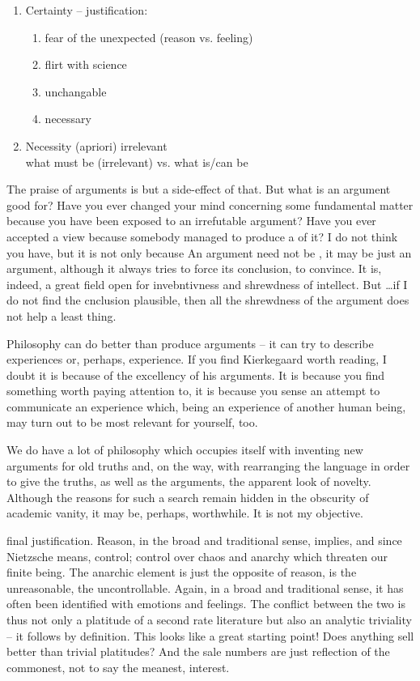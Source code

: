 {\begin{enumerate}
\item Certainty -- justification:
 \begin{enumerate}
  \item fear of the unexpected (reason vs. feeling)
  \item flirt with science
  \item[\isimp] unchangable
  \item[\isimp] necessary
 \end{enumerate}
\item Necessity (apriori) \impl irrelevant \\
what must be (irrelevant) vs. what is/can be
\end{enumerate}

\pa
The praise of arguments is but a side-effect of that. But what is an 
argument good for? Have you ever changed your mind concerning some 
fundamental matter because you have been exposed to an irrefutable 
argument? Have you ever accepted a view because somebody managed to 
produce a  of it? I do not think you have, but it is not 
only because
 An argument need not be , it may be just an argument, although it always tries to force 
its conclusion, to convince. It is, indeed, a great field open for 
invebntivness and shrewdness of intellect. But \ldots if I do not find 
the cnclusion plausible, then all the shrewdness of the argument does 
not help a least thing.

Philosophy can do better than produce arguments -- it can try to 
describe experiences or, perhaps, experience. If you find Kierkegaard 
worth reading, I doubt it is because of the excellency of his 
arguments. It is because you find something worth paying attention to, 
it is because you sense an attempt to communicate an experience which, 
being an experience of another human being, may turn out to be most 
relevant for yourself, too.

\pa We do have a lot of philosophy which occupies itself with
inventing new arguments for old truths and, on the way, with
rearranging the language in order to give the truths, as well as the
arguments, the apparent look of novelty.  Although the reasons for
such a search remain hidden in the obscurity of academic vanity,
it may be, perhaps, worthwhile. It is not my objective.

final justification. 
Reason, in the broad and traditional sense, implies, and since Nietzsche 
means, control; control over 
chaos and anarchy which threaten our finite being. The 
anarchic element is just the opposite of reason, is the unreasonable, the 
uncontrollable. Again, in a broad and traditional sense, it has often been identified
with emotions and feelings.
The conflict between the two is thus not only a platitude of a second rate 
literature but also an analytic triviality -- it follows by definition. 
This looks like a great starting point! Does anything sell better than 
trivial platitudes? And the sale numbers are just reflection of the 
commonest, not to say the meanest, interest.

}
